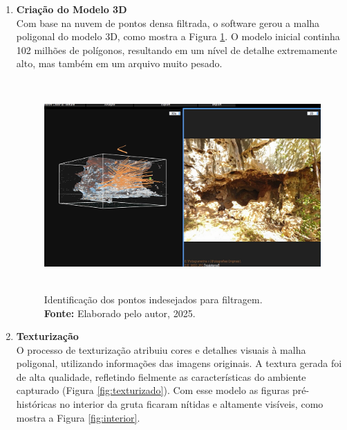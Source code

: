 \begin{enumerate}
\item \textbf{Criação do Modelo 3D} \\
Com base na nuvem de pontos densa filtrada, o software gerou a malha poligonal do modelo 3D, como mostra a Figura \ref{fig:modelo 3D solido}. O modelo inicial continha 102 milhões de polígonos, resultando em um nível de detalhe extremamente alto, mas também em um arquivo muito pesado.
\begin{figure}[H]
        \centering
        \includegraphics[height=8cm, keepaspectratio]{img/reality e fotogrametria processo/modelo solido e foto.png}
        \caption{Identificação dos pontos indesejados para filtragem. \\
            \textbf{Fonte:} Elaborado pelo autor, 2025.}
        \label{fig:modelo 3D solido}
\end{figure}

\item \textbf{Texturização} \\
O processo de texturização atribuiu cores e detalhes visuais à malha poligonal, utilizando informações das imagens originais. A textura gerada foi de alta qualidade, refletindo fielmente as características do ambiente capturado (Figura \ref{fig:texturizado}). Com esse modelo as figuras pré-históricas no interior da gruta ficaram nítidas e altamente visíveis, como mostra a Figura \ref{fig:interior}.


\end{enumerate}
